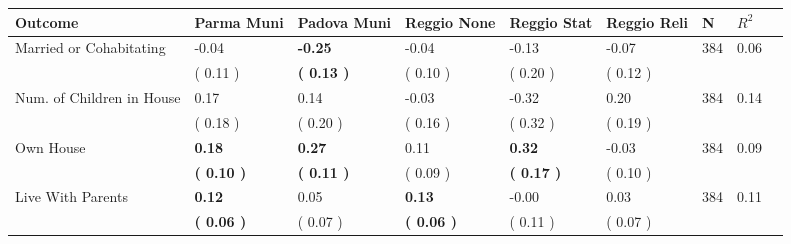 \begin{tabular}{L{6.2cm} C{1.8cm} C{1.8cm} C{1.8cm} C{1.8cm} C{1.8cm} C{1.8cm} C{0.3cm} C{0.3cm}}
\toprule
 \textbf{Outcome} & \textbf{Parma Muni} & \textbf{Padova Muni} & \textbf{Reggio None} & \textbf{Reggio Stat} & \textbf{Reggio Reli} & \textbf{N} & \textbf{$ R^2$} \\
\midrule
Married or Cohabitating &     -0.04 & \textbf{    -0.25} &     -0.04 &     -0.13 &     -0.07  & 384 &       0.06 \\ 
 & (     0.11 ) & \textbf{(     0.13 )} & (     0.10 ) & (     0.20 ) & (     0.12 )  & \\
Num. of Children in House &      0.17 &      0.14 &     -0.03 &     -0.32 &      0.20  & 384 &       0.14 \\ 
 & (     0.18 ) & (     0.20 ) & (     0.16 ) & (     0.32 ) & (     0.19 )  & \\
Own House & \textbf{     0.18} & \textbf{     0.27} &      0.11 & \textbf{     0.32} &     -0.03  & 384 &       0.09 \\ 
 & \textbf{(     0.10 )} & \textbf{(     0.11 )} & (     0.09 ) & \textbf{(     0.17 )} & (     0.10 )  & \\
Live With Parents & \textbf{     0.12} &      0.05 & \textbf{     0.13} &     -0.00 &      0.03  & 384 &       0.11 \\ 
 & \textbf{(     0.06 )} & (     0.07 ) & \textbf{(     0.06 )} & (     0.11 ) & (     0.07 )  & \\
\bottomrule
\end{tabular}

